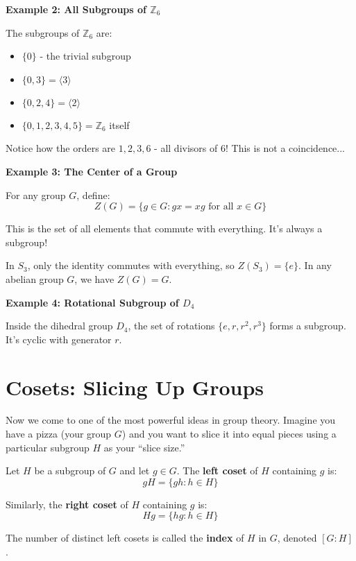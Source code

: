 \documentclass[12pt]{article}
\begin{document}
\begin{examplebox}
\textbf{Example 2: All Subgroups of $\mathbb{Z}_6$}

The subgroups of $\mathbb{Z}_6$ are:
\begin{itemize}
\item $\{0\}$ - the trivial subgroup
\item $\{0, 3\} = \langle 3 \rangle$ 
\item $\{0, 2, 4\} = \langle 2 \rangle$
\item $\{0, 1, 2, 3, 4, 5\} = \mathbb{Z}_6$ itself
\end{itemize}

Notice how the orders are $1, 2, 3, 6$ - all divisors of $6$! This is not a coincidence...
\end{examplebox}

\begin{examplebox}
\textbf{Example 3: The Center of a Group}

For any group $G$, define:
\[Z(G) = \{g \in G : gx = xg \text{ for all } x \in G\}\]

This is the set of all elements that commute with everything. It's always a subgroup!

In $S_3$, only the identity commutes with everything, so $Z(S_3) = \{e\}$.
In any abelian group $G$, we have $Z(G) = G$.
\end{examplebox}

\begin{examplebox}
\textbf{Example 4: Rotational Subgroup of $D_4$}

Inside the dihedral group $D_4$, the set of rotations $\{e, r, r^2, r^3\}$ forms a subgroup. It's cyclic with generator $r$.
\end{examplebox}

\section{\textcolor{SectionColor}{Cosets: Slicing Up Groups}}

Now we come to one of the most powerful ideas in group theory. Imagine you have a pizza (your group $G$) and you want to slice it into equal pieces using a particular subgroup $H$ as your ``slice size.''

\begin{definitionbox}
Let $H$ be a subgroup of $G$ and let $g \in G$. The \textbf{left coset} of $H$ containing $g$ is:
\[gH = \{gh : h \in H\}\]

Similarly, the \textbf{right coset} of $H$ containing $g$ is:
\[Hg = \{hg : h \in H\}\]

The number of distinct left cosets is called the \textbf{index} of $H$ in $G$, denoted $[G:H]$.
\end{definitionbox}
\end{document}
